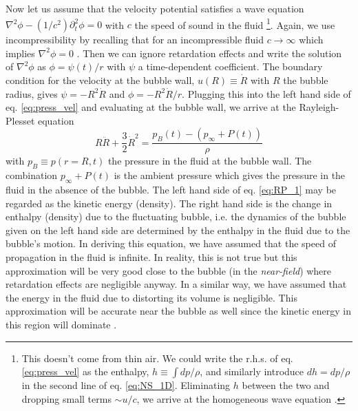 \documentclass[11pt,prb,aps,nofootinbib,superscriptaddress,floatfix]{revtex4-2}
\begin{document}
Now let us assume that the velocity potential satisfies a wave equation $\nabla^2 \phi - (1/c^2)\partial_t^2 \phi =0 $ with $c$ the speed of sound in the fluid \footnote{This doesn't come from thin air. We could write the r.h.s. of eq. \ref{eq:press_vel} as the enthalpy, $h\equiv \int dp/\rho$, and similarly introduce $dh=dp/\rho$ in the second line of eq. \ref{eq:NS_1D}. Eliminating $h$ between the two and dropping small terms $\sim u/c$, we arrive at the homogeneous wave equation \cite{leighton2007derivation,brenner2002single,prosperetti1999old}.}. Again, we use incompressibility by recalling that for an incompressible fluid $c\rightarrow \infty$ which implies $\nabla^2 \phi =0$ \cite{prosperetti1999old,prosperetti1986bubble,leighton2007derivation}. Then we can ignore retardation effects and write the solution of $\nabla^2 \phi$ as $\phi = \psi(t)/r$ with $\psi$ a time-dependent coefficient. The boundary condition for the velocity at the bubble wall, $u(R)\equiv \dot{R}$ with $R$ the bubble radius, gives $\psi= -R^2 \dot{R}$ and $\phi = -R^2 \dot{R}/r$. Plugging this into the left hand side of eq. \ref{eq:press_vel} and evaluating at the bubble wall, we arrive at the Rayleigh-Plesset equation \cite{prosperetti1999old,prosperetti1986bubble,leighton2007derivation,plesset1949dynamics,plesset1977bubble}
\begin{equation}
    R\ddot{R}+\frac{3}{2}\dot{R}^2 = \frac{p_B(t)-(p_\infty+P(t))}{\rho}
    \label{eq:RP_1}
\end{equation}
with $p_B \equiv p(r=R,t)$ the pressure in the fluid at the bubble wall. The combination $p_\infty+P(t)$ is the ambient pressure \cite{prosperetti1999old,prosperetti1986bubble} which gives the pressure in the fluid in the absence of the bubble. The left hand side of eq. \ref{eq:RP_1} may be regarded as the kinetic energy (density). The right hand side is the change in enthalpy (density) due to the fluctuating bubble, i.e. the dynamics of the bubble given on the left hand side are determined by the enthalpy in the fluid due to the bubble's motion. In deriving this equation, we have assumed that the speed of propagation in the fluid is infinite. In reality, this is not true but this approximation will be very good close to the bubble (in the \emph{near-field}) where retardation effects are negligible anyway. In a similar way, we have assumed that the energy in the fluid due to distorting its volume is negligible. This approximation will be accurate near the bubble as well since the kinetic energy in this region will dominate \cite{prosperetti1999old}.
\end{document}
